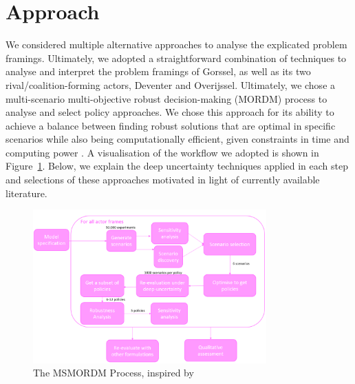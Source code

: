 \section{Approach}
\label{s:approach}


We considered multiple alternative approaches to analyse the explicated problem framings. Ultimately, we adopted a straightforward combination of techniques to analyse and interpret the problem framings of Gorssel, as well as its two rival/coalition-forming actors, Deventer and Overijssel. Ultimately, we chose a multi-scenario multi-objective robust decision-making (MORDM) process to analyse and select policy approaches. We chose this approach for its ability to achieve a balance between finding robust solutions that are optimal in specific scenarios while also being computationally efficient, given constraints in time and computing power \parencite{bartholomew_considering_2020}. A visualisation of the workflow we adopted is shown in Figure~\ref{fig:msmordm}. Below, we explain the deep uncertainty techniques applied in each step and selections of these approaches motivated in light of currently available literature. 

\begin{figure}[h]
    \centering
    \includegraphics[width=0.8\textwidth]{report/figures/methodology.png}
    \caption{The MSMORDM Process, inspired by  \citeauthor{bartholomew_considering_2020}}
    \label{fig:msmordm}
\end{figure}

